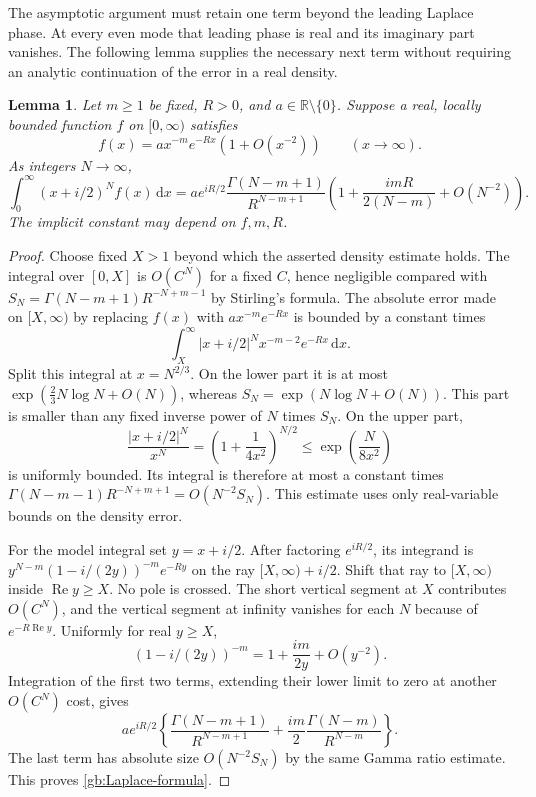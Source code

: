 \documentclass[11pt,a4paper]{article}
\numberwithin{equation}{section}
\newtheorem{lemma}[theorem]{Lemma}
\theoremstyle{definition}
\theoremstyle{remark}
\newcommand{\dd}{\,\mathrm d}
\newcommand{\Rea}{\operatorname{Re}}
\begin{document}
The asymptotic argument must retain one term beyond the leading
Laplace phase.  At every even mode that leading phase is real and
its imaginary part vanishes.  The following lemma supplies the
necessary next term without requiring an analytic continuation of
the error in a real density.

\begin{lemma}\label{gb:Laplace}
Let $m\ge1$ be fixed, $R>0$, and $a\in\mathbb R\setminus\{0\}$.
Suppose a real, locally bounded function $f$ on $[0,\infty)$ satisfies
\[
             f(x)=ax^{-m}e^{-Rx}(1+O(x^{-2}))\qquad(x\to\infty).
\]
As integers $N\to\infty$,
\begin{equation}\label{gb:Laplace-formula}
 \int_0^\infty(x+i/2)^Nf(x)\dd x
 =ae^{iR/2}\frac{\Gamma(N-m+1)}{R^{N-m+1}}
       \left(1+\frac{imR}{2(N-m)}+O(N^{-2})\right).
\end{equation}
The implicit constant may depend on $f,m,R$.
\end{lemma}

\begin{proof}
Choose fixed $X>1$ beyond which the asserted density estimate holds.
The integral over $[0,X]$ is $O(C^N)$ for a fixed $C$, hence
negligible compared with
$S_N=\Gamma(N-m+1)R^{-N+m-1}$ by Stirling's formula.
The absolute error made on $[X,\infty)$ by replacing $f(x)$ with
$ax^{-m}e^{-Rx}$ is bounded by a constant times
\[
             \int_X^\infty|x+i/2|^Nx^{-m-2}e^{-Rx}\dd x.
\]
Split this integral at $x=N^{2/3}$.  On the lower part it is at most
$\exp(\tfrac23N\log N+O(N))$, whereas
$S_N=\exp(N\log N+O(N))$.  This part is smaller than any fixed
inverse power of $N$ times $S_N$.  On the upper part,
\[
 \frac{|x+i/2|^N}{x^N}
   =\left(1+\frac1{4x^2}\right)^{N/2}
   \le\exp\!\left(\frac{N}{8x^2}\right)
\]
is uniformly bounded.  Its integral is therefore at most a constant
times $\Gamma(N-m-1)R^{-N+m+1}=O(N^{-2}S_N)$.
This estimate uses only real-variable bounds on the density error.

For the model integral set $y=x+i/2$.  After factoring $e^{iR/2}$,
its integrand is
$y^{N-m}(1-i/(2y))^{-m}e^{-Ry}$ on the ray
$[X,\infty)+i/2$.  Shift that ray to $[X,\infty)$ inside
$\Rea y\ge X$.  No pole is crossed.  The short vertical segment
at $X$ contributes $O(C^N)$, and the vertical segment at infinity
vanishes for each $N$ because of $e^{-R\Rea y}$.
Uniformly for real $y\ge X$,
\[
                 (1-i/(2y))^{-m}=1+\frac{im}{2y}+O(y^{-2}).
\]
Integration of the first two terms, extending their lower limit to
zero at another $O(C^N)$ cost, gives
\[
 ae^{iR/2}\left\{
 \frac{\Gamma(N-m+1)}{R^{N-m+1}}
 +\frac{im}{2}\frac{\Gamma(N-m)}{R^{N-m}}\right\}.
\]
The last term has absolute size $O(N^{-2}S_N)$ by the same Gamma
ratio estimate.  This proves \eqref{gb:Laplace-formula}.
\end{proof}
\end{document}
